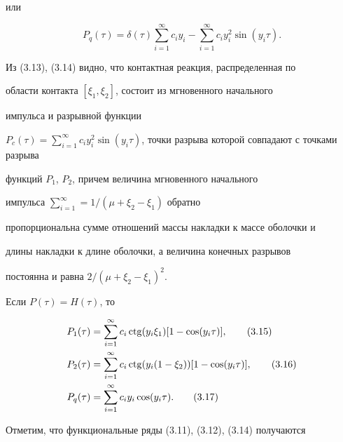 или


\begin{equation}


P_{q}(\tau)=\delta(\tau)\sum_{i=1}^{\infty}


c_{i}y_{i}-


\sum_{i=1}^{\infty}c_{i}y_{i}^2\sin(y_{i}\tau).


\tag{3.14}


\end{equation}


Из (3.13), (3.14) видно, что контактная реакция, распределенная по


области контакта $[\xi_{1}, \xi_{2}]$, состоит из мгновенного начального


импульса и разрывной функции


$P_c(\tau)=\sum\limits_{i=1}^{\infty}c_{i}y_{i}^2


\sin(y_{i}\tau)$, точки разрыва которой совпадают с точками разрыва


функций $P_{1}$, $P_{2}$, причем величина мгновенного начального


импульса $\sum\limits_{i=1}^{\infty}=1/(\mu+\xi_2-\xi_1)$ обратно


пропорциональна сумме отношений массы накладки к массе оболочки и


длины накладки к длине оболочки, а величина конечных разрывов


постоянна и равна $2/(\mu+\xi_2-\xi_1)^2$.





Если $P(\tau)=H(\tau)$, то


\begin{align}


P_{1}(\tau)&=\sum_{i=1}^{\infty}c_{i}\ctg(y_{i}\xi_1)


[1-\cos(y_{i}\tau)],


\tag{3.15} \\


P_{2}(\tau)&=\sum_{i=1}^{\infty}c_{i}\ctg(y_{i}(1-\xi_2))


[1-\cos(y_{i}\tau)],


\tag{3.16} \\


P_{q}(\tau)&=\sum_{i=1}^{\infty}c_{i}y_{i}\cos(y_{i}\tau).


\tag{3.17}


\end{align}


Отметим, что функциональные ряды (3.11), (3.12), (3.14) получаются


